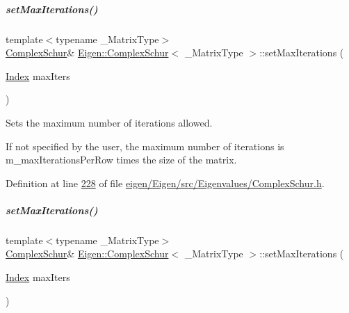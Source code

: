 \mbox{\label{group___eigenvalues___module_a6ca227fbd5387f3a625351354b8eec44}} 
\subparagraph{\texorpdfstring{set\+Max\+Iterations()}{setMaxIterations()}\hspace{0.1cm}{\footnotesize\ttfamily [1/2]}}
{\footnotesize\ttfamily template$<$typename \+\_\+\+Matrix\+Type$>$ \\
\hyperlink{group___eigenvalues___module_class_eigen_1_1_complex_schur}{Complex\+Schur}\& \hyperlink{group___eigenvalues___module_class_eigen_1_1_complex_schur}{Eigen\+::\+Complex\+Schur}$<$ \+\_\+\+Matrix\+Type $>$\+::set\+Max\+Iterations (\begin{DoxyParamCaption}\item[{\hyperlink{group___eigenvalues___module_a652104d13723a5b1db2937866a034557}{Index}}]{max\+Iters }\end{DoxyParamCaption})\hspace{0.3cm}{\ttfamily [inline]}}



Sets the maximum number of iterations allowed. 

If not specified by the user, the maximum number of iterations is m\+\_\+max\+Iterations\+Per\+Row times the size of the matrix. 

Definition at line \hyperlink{eigen_2_eigen_2src_2_eigenvalues_2_complex_schur_8h_source_l00228}{228} of file \hyperlink{eigen_2_eigen_2src_2_eigenvalues_2_complex_schur_8h_source}{eigen/\+Eigen/src/\+Eigenvalues/\+Complex\+Schur.\+h}.

\mbox{\label{group___eigenvalues___module_a6ca227fbd5387f3a625351354b8eec44}} 
\subparagraph{\texorpdfstring{set\+Max\+Iterations()}{setMaxIterations()}\hspace{0.1cm}{\footnotesize\ttfamily [2/2]}}
{\footnotesize\ttfamily template$<$typename \+\_\+\+Matrix\+Type$>$ \\
\hyperlink{group___eigenvalues___module_class_eigen_1_1_complex_schur}{Complex\+Schur}\& \hyperlink{group___eigenvalues___module_class_eigen_1_1_complex_schur}{Eigen\+::\+Complex\+Schur}$<$ \+\_\+\+Matrix\+Type $>$\+::set\+Max\+Iterations (\begin{DoxyParamCaption}\item[{\hyperlink{group___eigenvalues___module_a652104d13723a5b1db2937866a034557}{Index}}]{max\+Iters }\end{DoxyParamCaption})\hspace{0.3cm}{\ttfamily [inline]}}




